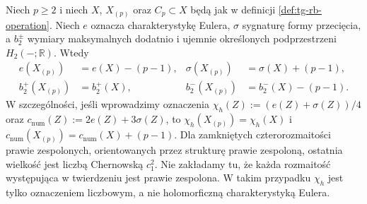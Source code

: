 \begin{twierdzenie}
\label{thm:tg-rb-invariants}
Niech $p\geq2$ i niech $X$, $X_{(p)}$ oraz
$C_p\subset X$ będą jak w definicji
\ref{def:tg-rb-operation}.
Niech $e$ oznacza charakterystykę Eulera,
$\sigma$ sygnaturę formy przecięcia, a
$b_2^\pm$ wymiary maksymalnych dodatnio i
ujemnie określonych podprzestrzeni
$H_2(-;\mathbb R)$.
Wtedy
\[
\begin{aligned}
e(X_{(p)})&=e(X)-(p-1), &
\sigma(X_{(p)})&=\sigma(X)+(p-1),\\
b_2^+(X_{(p)})&=b_2^+(X), &
b_2^-(X_{(p)})&=b_2^-(X)-(p-1).
\end{aligned}
\]
W szczególności, jeśli wprowadzimy oznaczenia
$\chi_h(Z):=(e(Z)+\sigma(Z))/4$ oraz
$c_{\mathrm{num}}(Z):=2e(Z)+3\sigma(Z)$,
to $\chi_h(X_{(p)})=\chi_h(X)$ i
$c_{\mathrm{num}}(X_{(p)})=c_{\mathrm{num}}(X)+(p-1)$.
Dla zamkniętych czterorozmaitości prawie zespolonych,
orientowanych przez strukturę prawie zespoloną,
ostatnia wielkość jest liczbą Chernowską $c_1^2$.
Nie zakładamy tu, że każda rozmaitość występująca
w twierdzeniu jest prawie zespolona. W takim przypadku
$\chi_h$ jest tylko oznaczeniem liczbowym, a nie holomorficzną
charakterystyką Eulera.
\end{twierdzenie}

